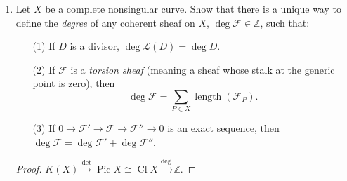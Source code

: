 \documentclass{article}
\newcommand{\fF}{\mathcal{F}}
\newcommand{\fL}{\mathcal{L}}
\newcommand{\Z}{\mathbb{Z}}
\DeclareMathOperator{\pic}{Pic}
\DeclareMathOperator{\cl}{Cl}
\DeclareMathOperator{\len}{length}
\begin{document}
\begin{enumerate} [label=\textbf{\arabic*.}, leftmargin=0em]
\begin{proof}
\begin{itemize}
\end{itemize} 
\end{proof}

\item Let $X$ be a complete nonsingular curve. Show that there is a unique way to define the \textit{degree} of any coherent sheaf on $X$, $\deg \fF \in \Z$, such that:
\begin{itemize}
    \item[(1)] If $D$ is a divisor, $\deg \fL(D) = \deg D$.
    \item[(2)] If $\fF$ is a \textit{torsion sheaf} (meaning a sheaf whose stalk at the generic point is zero), then $$\deg \fF = \sum_{P \in X} \len(\fF_P).$$
    \item[(3)] If $0 \to \fF' \to \fF \to \fF'' \to 0$ is an exact sequence, then $\deg \fF = \deg \fF' + \deg \fF''$.
\end{itemize}

\begin{proof} 
    $K(X) \xrightarrow{\det} \pic X \cong \cl{X} \xrightarrow{\deg} \Z$.
\end{proof}

\end{enumerate}
\end{document}
